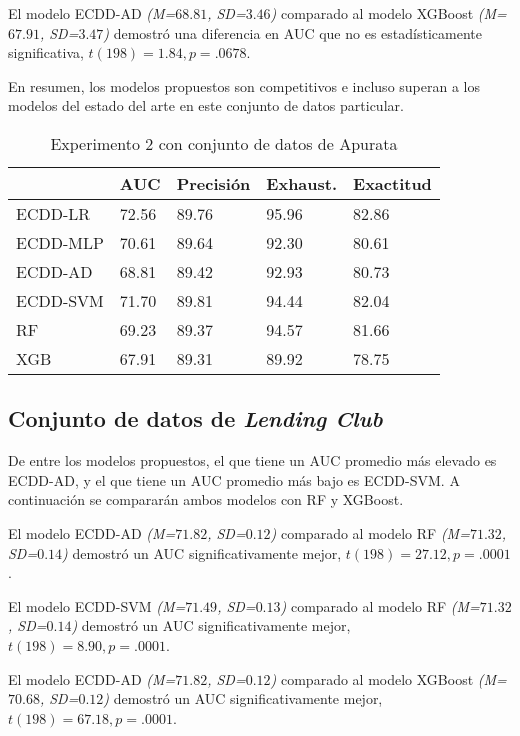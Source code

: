 El modelo ECDD-AD \textit{(M=$68.81$, SD=$3.46$)} comparado al modelo \ac{XGBoost} \textit{(M=$67.91$, SD=$3.47$)} demostró una diferencia en \ac{AUC} que no es estadísticamente significativa, $t(198)=1.84, p=.0678$.

En resumen, los modelos propuestos son competitivos e incluso superan a los modelos del estado del arte en este conjunto de datos particular.

\begin{table}[htbp]
\centering
\caption{Experimento 2 con conjunto de datos de Apurata}
\label{tab:apurata-proc2}
\begin{tabularx}{0.75\textwidth}{|l|Y Y Y Y|}
				\hline
				& AUC		& Precisión	& Exhaust.		& Exactitud	\\
				\hline
ECDD-LR			& 72.56		& 89.76		& 95.96			& 82.86		\\		%
ECDD-MLP	 	& 70.61		& 89.64		& 92.30			& 80.61		\\		%
ECDD-AD			& 68.81		& 89.42		& 92.93			& 80.73		\\		%
ECDD-SVM	 	& 71.70		& 89.81		& 94.44			& 82.04		\\		%
				\hline
RF		 		& 69.23		& 89.37		& 94.57			& 81.66		\\		%
XGB				& 67.91		& 89.31		& 89.92			& 78.75		\\		%
				\hline
\end{tabularx}
\end{table}

\subsection{Conjunto de datos de \textit{Lending Club}}

De entre los modelos propuestos, el que tiene un \ac{AUC} promedio más elevado es ECDD-AD, y el que tiene un \ac{AUC} promedio más bajo es ECDD-SVM. A continuación se compararán ambos modelos con \ac{RF} y \ac{XGBoost}.

El modelo ECDD-AD \textit{(M=$71.82$, SD=$0.12$)} comparado al modelo \ac{RF} \textit{(M=$71.32$, SD=$0.14$)} demostró un \ac{AUC} significativamente mejor, $t(198)=27.12, p=.0001$.

El modelo ECDD-SVM  \textit{(M=$71.49$, SD=$0.13$)} comparado al modelo \ac{RF} \textit{(M=$71.32$, SD=$0.14$)} demostró un \ac{AUC} significativamente mejor, $t(198)=8.90, p=.0001$.

El modelo ECDD-AD \textit{(M=$71.82$, SD=$0.12$)} comparado al modelo \ac{XGBoost} \textit{(M=$70.68$, SD=$0.12$)} demostró un \ac{AUC} significativamente mejor, $t(198)=67.18, p=.0001$.

